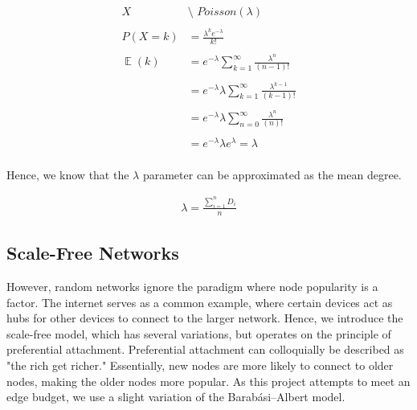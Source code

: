 \documentclass[journal]{IEEEtran}
\DeclareMathOperator{\EX}{\mathbb{E}}%
\begin{document}
\begin{equation}
    \begin{split}
        X &\texttt{\char`\~} Poisson(\lambda) \\
        \\
        P(X=k) &= \frac{\lambda^k e^{-\lambda}}{k!} \\
        \\
        \EX(k) &= e^{-\lambda}\sum_{k=1}^{\infty} \frac{\lambda^n}{(n-1)!}\\
        \\
        &= e^{-\lambda}\lambda\sum_{k=1}^{\infty} \frac{\lambda^{k-1}}{(k-1)!}\\
        \\
        &= e^{-\lambda}\lambda\sum_{n=0}^{\infty} \frac{\lambda^{n}}{(n)!}\\
        \\
        &= e^{-\lambda}\lambda e^{\lambda} = \lambda\\
    \end{split}
    \label{eq:mutual}
\end{equation}

\noindent Hence, we know that the $\lambda$ parameter can be approximated as the mean degree.

\begin{equation}
    \begin{split}
        \lambda = \frac{\sum_{i=1}^{n}D_i}{n}
    \end{split}
    \label{eq:poisson_distribution}
\end{equation}


\subsection{Scale-Free Networks}
\noindent However, random networks ignore the paradigm where node popularity is a factor. The internet serves as a common example, where certain devices act as hubs for other devices to connect to the larger network. Hence, we introduce the scale-free model, which has several variations, but operates on the principle of preferential attachment. Preferential attachment can colloquially be described as "the rich get richer." Essentially, new nodes are more likely to connect to older nodes, making the older nodes more popular. As this project attempts to meet an edge budget, we use a slight variation of the Barabási–Albert model.\\
\end{document}
